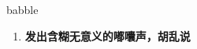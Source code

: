 
\begin{frame}
{\huge babble}
\begin{center}
\begin{enumerate}\Large
  \item \textbf{发出含糊无意义的嘟囔声，胡乱说}
\end{enumerate}
\end{center}
\end{frame}
